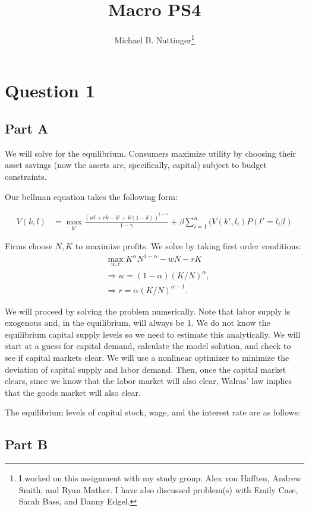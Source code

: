 \documentclass[11pt]{article} %
\title{Macro PS4}
\author{Michael B. Nattinger\footnote{I worked on this assignment with my study group: Alex von Hafften, Andrew Smith, and Ryan Mather. I have also discussed problem(s) with Emily Case, Sarah Bass, and Danny Edgel.}}
\begin{document}
\maketitle
\section{Question 1}
\subsection{Part A}
We will solve for the equilibrium. 
Consumers maximize utility by choosing their asset savings (now the assets are, specifically, capital) subject to budget constraints.

Our bellman equation takes the following form:

\begin{align*}
V(k,l)&= \max_{k'} \frac{(wl + rk - k' + k(1-\delta))^{1-\gamma}}{1-\gamma} + \beta\sum_{i=1}^n(V(k',l_i)P(l'=l_i|l)
\end{align*}

Firms choose $N,K$ to maximize profits. We solve by taking first order conditions:
\begin{align*}
&\max_{w,r} K^{\alpha}N^{1-\alpha} - wN - rK\\
&\Rightarrow w = (1-\alpha)(K/N)^{\alpha},\\
&\Rightarrow r = \alpha(K/N)^{\alpha - 1}.
\end{align*}

We will proceed by solving the problem numerically. Note that labor supply is exogenous and, in the equilibrium, will always be 1. We do not know the equilibrium capital supply levels so we need to estimate this analytically. We will start at a guess for capital demand, calculate the model solution, and check to see if capital markets clear. We will use a nonlinear optimizer to minimize the deviation of capital supply and labor demand. Then, once the capital market clears, since we know that the labor market will also clear, Walras' law implies that the goods market will also clear.

The equilibrium levels of capital stock, wage, and the interest rate are as follows:


\begin{center}

\end{center}
\subsection{Part B}
\end{document}
